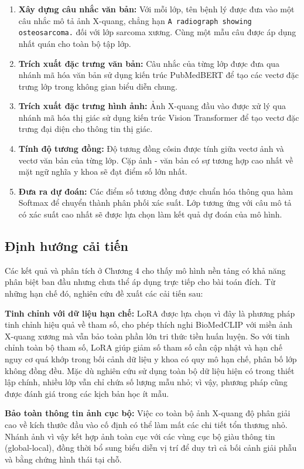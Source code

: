 \begin{enumerate}
    \item \textbf{Xây dựng câu nhắc văn bản:} Với mỗi lớp, tên bệnh lý được đưa vào một câu nhắc mô tả ảnh X-quang, chẳng hạn \texttt{A radiograph showing osteosarcoma.} đối với lớp sarcoma xương. Cùng một mẫu câu được áp dụng nhất quán cho toàn bộ tập lớp.
    \item \textbf{Trích xuất đặc trưng văn bản:} Câu nhắc của từng lớp được đưa qua nhánh mã hóa văn bản sử dụng kiến trúc PubMedBERT để tạo các vectơ đặc trưng lớp trong không gian biểu diễn chung.
    \item \textbf{Trích xuất đặc trưng hình ảnh:} Ảnh X-quang đầu vào được xử lý qua nhánh mã hóa thị giác sử dụng kiến trúc Vision Transformer để tạo vectơ đặc trưng đại diện cho thông tin thị giác.
    \item \textbf{Tính độ tương đồng:} Độ tương đồng côsin được tính giữa vectơ ảnh và vectơ văn bản của từng lớp. Cặp ảnh - văn bản có sự tương hợp cao nhất về mặt ngữ nghĩa y khoa sẽ đạt điểm số lớn nhất.
    \item \textbf{Đưa ra dự đoán:} Các điểm số tương đồng được chuẩn hóa thông qua hàm Softmax để chuyển thành phân phối xác suất. Lớp tương ứng với câu mô tả có xác suất cao nhất sẽ được lựa chọn làm kết quả dự đoán của mô hình.
\end{enumerate}

\subsection{Định hướng cải tiến}
\label{subsec:ch3_improvement_directions}

Các kết quả và phân tích ở Chương 4 cho thấy mô hình nền tảng có khả năng phân biệt ban đầu nhưng chưa thể áp dụng trực tiếp cho bài toán đích. Từ những hạn chế đó, nghiên cứu đề xuất các cải tiến sau:

\textbf{Tinh chỉnh với dữ liệu hạn chế:} LoRA được lựa chọn vì đây là phương pháp tinh chỉnh hiệu quả về tham số, cho phép thích nghi BioMedCLIP với miền ảnh X-quang xương mà vẫn bảo toàn phần lớn tri thức tiền huấn luyện. So với tinh chỉnh toàn bộ tham số, LoRA giúp giảm số tham số cần cập nhật và hạn chế nguy cơ quá khớp trong bối cảnh dữ liệu y khoa có quy mô hạn chế, phân bố lớp không đồng đều. Mặc dù nghiên cứu sử dụng toàn bộ dữ liệu hiện có trong thiết lập chính, nhiều lớp vẫn chỉ chứa số lượng mẫu nhỏ; vì vậy, phương pháp cũng được đánh giá trong các kịch bản học ít mẫu.

\textbf{Bảo toàn thông tin ảnh cục bộ:} Việc co toàn bộ ảnh X-quang độ phân giải cao về kích thước đầu vào cố định có thể làm mất các chi tiết tổn thương nhỏ. Nhánh ảnh vì vậy kết hợp ảnh toàn cục với các vùng cục bộ giàu thông tin (global-local), đồng thời bổ sung biểu diễn vị trí để duy trì cả bối cảnh giải phẫu và bằng chứng hình thái tại chỗ.

